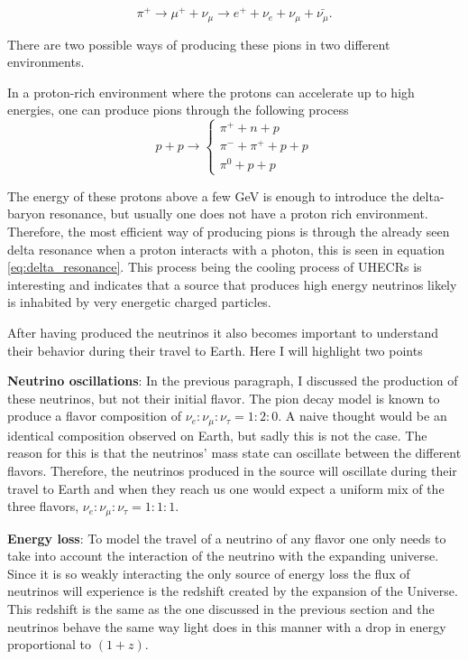 \begin{equation}
    \pi^+ \rightarrow \mu^+ + \nu_\mu \rightarrow e^+ + \nu_e + \nu_\mu + \bar{\nu_\mu}.
    \label{eq:pion_decay}
\end{equation}

There are two possible ways of producing these pions in two different environments. 

In a proton-rich environment where the protons can accelerate up to high energies, one can produce pions through the following process
\begin{equation}
    p + p \rightarrow \begin{cases}
        \pi^+ + n+ p \\
        \pi^- + \pi^+ +p + p  \\
        \pi^0 + p+p
    \end{cases}
\end{equation}

The energy of these protons above a few GeV is enough to introduce the delta-baryon resonance, but usually one does not have a proton rich environment.
Therefore, the most efficient way of producing pions is through the already seen delta resonance when a proton interacts with a photon, this is seen in equation \ref{eq:delta_resonance}.
This process being the cooling process of UHECRs is interesting and indicates that a source that produces high energy neutrinos likely is inhabited by very energetic charged particles. 

After having produced the neutrinos it also becomes important to understand their behavior during their travel to Earth. Here I will highlight two points


\textbf{Neutrino oscillations}:
In the previous paragraph, I discussed the production of these neutrinos, but not their initial flavor.
The pion decay model is known to produce a flavor composition of $\nu_e : \nu_\mu : \nu_\tau = 1:2:0$. 
A naive thought would be an identical composition observed on Earth, but sadly this is not the case. 
The reason for this is that the neutrinos' mass state can oscillate between the different flavors. Therefore, the neutrinos produced in the source will oscillate during their travel to Earth and when they reach us one would expect a 
uniform mix of the three flavors, $ \nu_e: \nu_\mu: \nu_\tau = 1:1:1$.

\textbf{Energy loss}:
To model the travel of a neutrino of any flavor one only needs to take into account the interaction of the neutrino with the expanding universe. Since it is so weakly interacting the only 
source of energy loss the flux of neutrinos will experience is the redshift created by the expansion of the Universe. This redshift is the same as the one discussed in the previous section and the neutrinos 
behave the same way light does in this manner with a drop in energy proportional to $(1+z)$.



